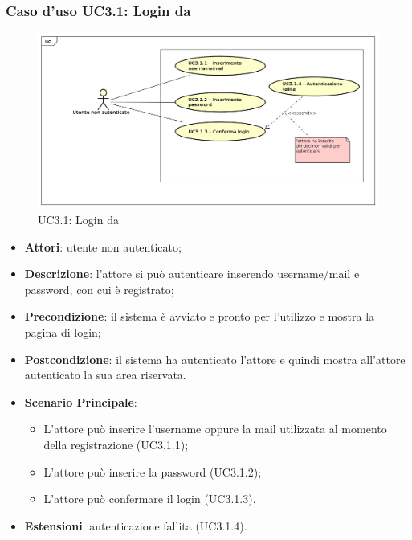 \subsubsection{Caso d'uso UC3.1: Login da \progetto}
\label{UC3.1}
\begin{figure}
	\centering
	\includegraphics[scale=0.5]{UML/UC3_1.png}
	\caption{UC3.1: Login da \progetto}
\end{figure}
\FloatBarrier
\begin{itemize}
	\item \textbf{Attori}: utente non autenticato;
	\item \textbf{Descrizione}: l'attore si può autenticare inserendo username/mail e password, con cui è registrato;
	\item \textbf{Precondizione}: il sistema è avviato e pronto per l'utilizzo e mostra la pagina di login;
	\item \textbf{Postcondizione}: il sistema ha autenticato l'attore e quindi mostra all'attore autenticato la sua area riservata.
	\item \textbf{Scenario Principale}:
	\begin{itemize}
		\item L'attore può inserire l'username oppure la mail utilizzata al momento della registrazione (UC3.1.1);
		\item L'attore può inserire la password (UC3.1.2);
		\item L'attore può confermare il login (UC3.1.3).
	\end{itemize}
	\item \textbf{Estensioni}: autenticazione fallita (UC3.1.4).
\end{itemize}

